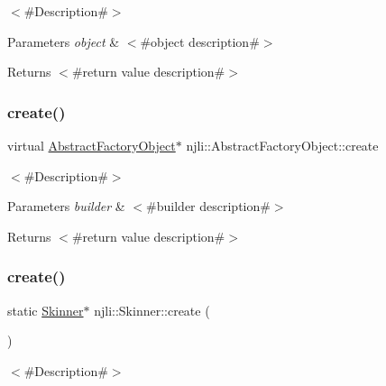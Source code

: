 $<$\#\+Description\#$>$


\begin{DoxyParams}{Parameters}
{\em object} & $<$\#object description\#$>$\\
\hline
\end{DoxyParams}
\begin{DoxyReturn}{Returns}
$<$\#return value description\#$>$ 
\end{DoxyReturn}
\mbox{\label{classnjli_1_1_skinner_a83a8876ae63b92804004cf3febe76573}} 
\subsubsection{\texorpdfstring{create()}{create()}\hspace{0.1cm}{\footnotesize\ttfamily [1/3]}}
{\footnotesize\ttfamily virtual \mbox{\hyperlink{classnjli_1_1_abstract_factory_object}{Abstract\+Factory\+Object}}$\ast$ njli\+::\+Abstract\+Factory\+Object\+::create}

$<$\#\+Description\#$>$


\begin{DoxyParams}{Parameters}
{\em builder} & $<$\#builder description\#$>$\\
\hline
\end{DoxyParams}
\begin{DoxyReturn}{Returns}
$<$\#return value description\#$>$ 
\end{DoxyReturn}
\mbox{\label{classnjli_1_1_skinner_a78feceb3e2e4785dddf2c34effa2a0f3}} 
\subsubsection{\texorpdfstring{create()}{create()}\hspace{0.1cm}{\footnotesize\ttfamily [2/3]}}
{\footnotesize\ttfamily static \mbox{\hyperlink{classnjli_1_1_skinner}{Skinner}}$\ast$ njli\+::\+Skinner\+::create (\begin{DoxyParamCaption}{ }\end{DoxyParamCaption})\hspace{0.3cm}{\ttfamily [static]}}

$<$\#\+Description\#$>$


